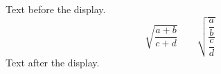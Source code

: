 \documentclass{article}
\begin{document}
Text before the display.
\[
  \sqrt{\frac{a + b}{c + d}}
  \qquad
  \sqrt{\frac{\dfrac{a}{b}}{\dfrac{c}{d}}}
\]
Text after the display.
\end{document}
